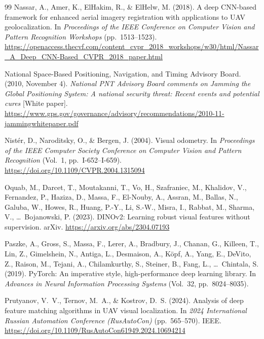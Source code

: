 \documentclass[english, Lau, oneside]{sapthesis}%
\begin{document}
\begin{thebibliography}{99}
Nassar, A., Amer, K., ElHakim, R., \& ElHelw, M. (2018).
A deep CNN-based framework for enhanced aerial imagery registration with applications to UAV geolocalization.
In \textit{Proceedings of the IEEE Conference on Computer Vision and Pattern Recognition Workshops} (pp.~1513--1523). \url{https://openaccess.thecvf.com/content_cvpr_2018_workshops/w30/html/Nassar_A_Deep_CNN-Based_CVPR_2018_paper.html}

National Space-Based Positioning, Navigation, and Timing Advisory Board. (2010, November 4).
\textit{National PNT Advisory Board comments on Jamming the Global Positioning System: A national security threat: Recent events and potential cures} [White paper].
\url{https://www.gps.gov/governance/advisory/recommendations/2010-11-jammingwhitepaper.pdf}

Nist{\'e}r, D., Naroditsky, O., \& Bergen, J. (2004).
Visual odometry.
In \textit{Proceedings of the IEEE Computer Society Conference on Computer Vision and Pattern Recognition} (Vol.~1, pp.~I-652--I-659). \url{https://doi.org/10.1109/CVPR.2004.1315094}

Oquab, M., Darcet, T., Moutakanni, T., Vo, H., Szafraniec, M., Khalidov, V., Fernandez, P., Haziza, D., Massa, F., El-Nouby, A., Assran, M., Ballas, N., Galuba, W., Howes, R., Huang, P.-Y., Li, S.-W., Misra, I., Rabbat, M., Sharma, V., \ldots\ Bojanowski, P. (2023).
DINOv2: Learning robust visual features without supervision.
arXiv. \url{https://arxiv.org/abs/2304.07193}

Paszke, A., Gross, S., Massa, F., Lerer, A., Bradbury, J., Chanan, G., Killeen, T., Lin, Z., Gimelshein, N., Antiga, L., Desmaison, A., K{\"o}pf, A., Yang, E., DeVito, Z., Raison, M., Tejani, A., Chilamkurthy, S., Steiner, B., Fang, L., \ldots\ Chintala, S. (2019).
PyTorch: An imperative style, high-performance deep learning library.
In \textit{Advances in Neural Information Processing Systems} (Vol.~32, pp.~8024--8035).

Prutyanov, V.~V., Ternov, M.~A., \& Kostrov, D.~S. (2024).
Analysis of deep feature matching algorithms in UAV visual localization.
In \textit{2024 International Russian Automation Conference (RusAutoCon)} (pp.~565--570). IEEE. \url{https://doi.org/10.1109/RusAutoCon61949.2024.10694214}


\end{thebibliography}
\end{document}
